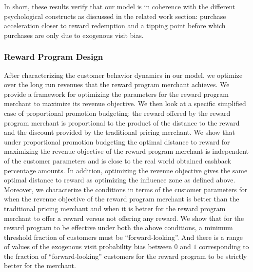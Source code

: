 In short, these results verify that our model is in coherence with the different psychological constructs as discussed in the related work section: purchase acceleration closer to reward redemption and a tipping point before which purchases are only due to exogenous visit bias.

\subsubsection{Reward Program Design}
After characterizing the customer behavior dynamics in our model, we optimize over the long run revenues that the reward program merchant achieves.
We provide a framework for optimizing the parameters for the reward program merchant to maximize its revenue objective.
We then look at a specific simplified case of proportional promotion budgeting: the reward offered by the reward program merchant is proportional to the product of the distance to the reward and the discount provided by the traditional pricing merchant.
We show that under proportional promotion budgeting the optimal distance to reward for maximizing the revenue objective of the reward program merchant is independent of the customer parameters and is close to the real world obtained cashback percentage amounts.
In addition, optimizing the revenue objective gives the same optimal distance to reward as optimizing the influence zone as defined above.
Moreover, we characterize the conditions in terms of the customer parameters for when the revenue objective of the reward program merchant is better than the traditional pricing merchant and when it is better for the reward program merchant to offer a reward versus not offering any reward.
We show that for the reward program to be effective under both the above conditions, a minimum threshold fraction of customers must be ``forward-looking''.
And there is a range of values of the exogenous visit probability bias between $0$ and $1$ corresponding to the fraction of ``forward-looking'' customers for the reward program to be strictly better for the merchant. 
